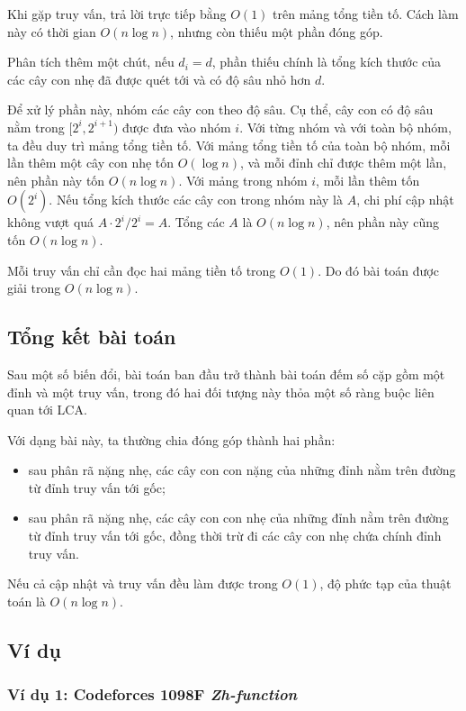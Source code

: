\documentclass[11pt]{article}
\begin{document}
Khi gặp truy vấn, trả lời trực tiếp bằng \(O(1)\) trên mảng tổng tiền tố. Cách
làm này có thời gian \(O(n\log n)\), nhưng còn thiếu một phần đóng góp.

Phân tích thêm một chút, nếu \(d_i=d\), phần thiếu chính là tổng kích thước của
các cây con nhẹ đã được quét tới và có độ sâu nhỏ hơn \(d\).

Để xử lý phần này, nhóm các cây con theo độ sâu. Cụ thể, cây con có độ sâu nằm
trong \([2^i,2^{i+1})\) được đưa vào nhóm \(i\). Với từng nhóm và với toàn bộ
nhóm, ta đều duy trì mảng tổng tiền tố. Với mảng tổng tiền tố của toàn bộ nhóm,
mỗi lần thêm một cây con nhẹ tốn \(O(\log n)\), và mỗi đỉnh chỉ được thêm một
lần, nên phần này tốn \(O(n\log n)\). Với mảng trong nhóm \(i\), mỗi lần thêm
tốn \(O(2^i)\). Nếu tổng kích thước các cây con trong nhóm này là \(A\), chi
phí cập nhật không vượt quá \(A\cdot 2^i/2^i=A\). Tổng các \(A\) là
\(O(n\log n)\), nên phần này cũng tốn \(O(n\log n)\).

Mỗi truy vấn chỉ cần đọc hai mảng tiền tố trong \(O(1)\). Do đó bài toán được
giải trong \(O(n\log n)\).

\subsection{Tổng kết bài toán}

Sau một số biến đổi, bài toán ban đầu trở thành bài toán đếm số cặp gồm một
đỉnh và một truy vấn, trong đó hai đối tượng này thỏa một số ràng buộc liên
quan tới LCA.

Với dạng bài này, ta thường chia đóng góp thành hai phần:
\begin{itemize}
  \item sau phân rã nặng nhẹ, các cây con con nặng của những đỉnh nằm trên
  đường từ đỉnh truy vấn tới gốc;
  \item sau phân rã nặng nhẹ, các cây con con nhẹ của những đỉnh nằm trên
  đường từ đỉnh truy vấn tới gốc, đồng thời trừ đi các cây con nhẹ chứa chính
  đỉnh truy vấn.
\end{itemize}
Nếu cả cập nhật và truy vấn đều làm được trong \(O(1)\), độ phức tạp của thuật
toán là \(O(n\log n)\).

\subsection{Ví dụ}

\subsubsection{Ví dụ 1: Codeforces 1098F \emph{Zh-function}}
\end{document}
